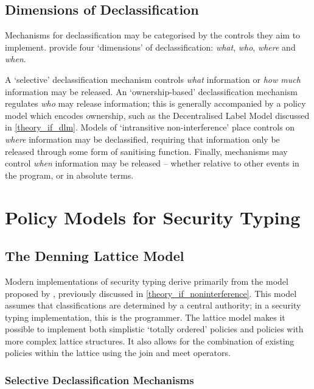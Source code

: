 \subsection{Dimensions of Declassification}

Mechanisms for declassification may be categorised by the controls they aim to implement. \citeauthor{sabelfeld2005dimensions} \cite{sabelfeld2005dimensions} provide four `dimensions' of declassification: \textit{what}, \textit{who}, \textit{where} and \textit{when}.

A `selective' declassification mechanism controls \textit{what} information or \textit{how much} information may be released. An `ownership-based' declassification mechanism regulates \textit{who} may release information; this is generally accompanied by a policy model which encodes ownership, such as the Decentralised Label Model discussed in \ref{theory_if_dlm}. Models of `intransitive non-interference' \cite{roscoe1999intransitive} place controls on \textit{where} information may be declassified, requiring that information only be released through some form of sanitising function. Finally, mechanisms may control \textit{when} information may be released -- whether relative to other events in the program, or in absolute terms.

\section{Policy Models for Security Typing}

\subsection{The Denning Lattice Model}

Modern implementations of security typing derive primarily from the model proposed by \citeauthor{denning1977certification} \cite{denning1977certification}, previously discussed in \ref{theory_if_noninterference}. This model assumes that classifications are determined by a central authority; in a security typing implementation, this is the programmer. The lattice model makes it possible to implement both simplistic `totally ordered' policies and policies with more complex lattice structures. It also allows for the combination of existing policies within the lattice using the join and meet operators.

\subsubsection{Selective Declassification Mechanisms}

